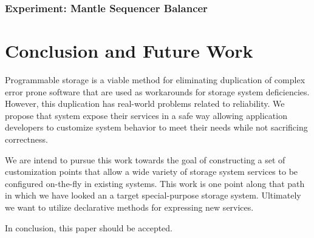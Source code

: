 \documentclass[10pt,twocolumn]{article}
\begin{document}
\subsubsection{Experiment: Mantle Sequencer
Balancer}\label{experiment-mantle-sequencer-balancer}

\section{Conclusion and Future Work}\label{conclusion-and-future-work}

Programmable storage is a viable method for eliminating duplication of
complex error prone software that are used as workarounds for storage
system deficiencies. However, this duplication has real-world problems
related to reliability. We propose that system expose their services in
a safe way allowing application developers to customize system behavior
to meet their needs while not sacrificing correctness.

We are intend to pursue this work towards the goal of constructing a set
of customization points that allow a wide variety of storage system
services to be configured on-the-fly in existing systems. This work is
one point along that path in which we have looked an a target
special-purpose storage system. Ultimately we want to utilize
declarative methods for expressing new services.

In conclusion, this paper should be accepted.

\printbibliography
\end{document}
